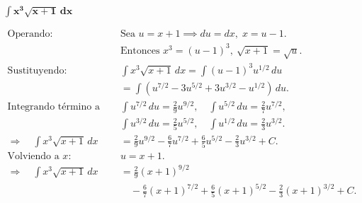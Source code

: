 $\displaystyle \mathbf{\int x^{3} \sqrt{x+1}\,dx}$

\nopagebreak
$$
\begin{aligned}
\text{Operando: } &
\text{Sea } u = x + 1 \implies du = dx, \; x = u - 1. \\[6pt]
&\text{Entonces } x^{3} = (u - 1)^{3}, \ \sqrt{x+1} = \sqrt{u}. \\[6pt]
\text{Sustituyendo: } &
\int x^{3}\sqrt{x+1}\,dx
= \int (u-1)^{3}u^{1/2}\,du \\[6pt]
&= \int (u^{7/2} - 3u^{5/2} + 3u^{3/2} - u^{1/2})\,du. \\[6pt]
\text{Integrando término a término: } &
\int u^{7/2}\,du = \tfrac{2}{9}u^{9/2}, \quad
\int u^{5/2}\,du = \tfrac{2}{7}u^{7/2}, \\[3pt]
&\int u^{3/2}\,du = \tfrac{2}{5}u^{5/2}, \quad
\int u^{1/2}\,du = \tfrac{2}{3}u^{3/2}. \\[6pt]
\Rightarrow\quad
\int x^{3}\sqrt{x+1}\,dx
&= \tfrac{2}{9}u^{9/2}
- \tfrac{6}{7}u^{7/2}
+ \tfrac{6}{5}u^{5/2}
- \tfrac{2}{3}u^{3/2} + C. \\[8pt]
\text{Volviendo a } x: &
u = x + 1. \\[6pt]
\Rightarrow\quad
\int x^{3}\sqrt{x+1}\,dx
&= \tfrac{2}{9}(x+1)^{9/2}
\\[3pt]
&\quad - \tfrac{6}{7}(x+1)^{7/2}
+ \tfrac{6}{5}(x+1)^{5/2}
- \tfrac{2}{3}(x+1)^{3/2} + C.
\end{aligned}
$$
